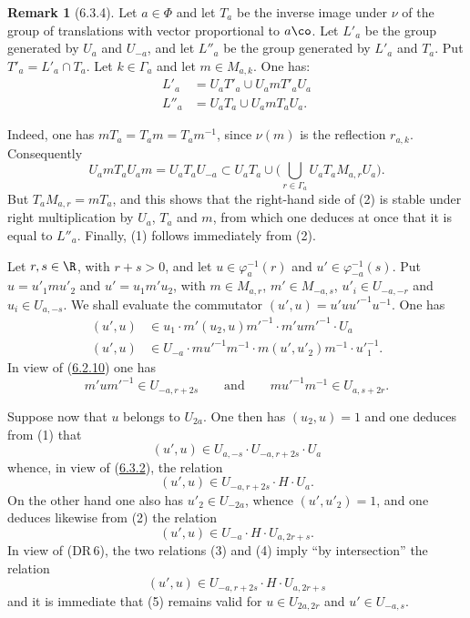 \documentclass[12pt,a4paper,oneside,english]{smfart}
\makeatletter
\newcommand{\btanchor}[1]{\leavevmode\Hy@raisedlink{\hypertarget{bt:#1}{}}}
\newcommand{\btpageanchor}[1]{\Hy@raisedlink{\hypertarget{p:#1}{}}}
\newcommand{\btref}[1]{\hyperlink{bt:#1}{#1}}
\newcommand{\btpage}[1]{\marginnote{p.~#1}\btpageanchor{#1}}
\newcommand{\pmark}[1]{\btpage{#1}}
\theoremstyle{definition}
\theoremstyle{bt}
\newtheorem{rem}{Remark}
\makeatother
\begin{document}
\begin{rem}[6.3.4]\btanchor{6.3.4}
Let $a\in\Phi$ and let $T_a$ be the inverse image under $\nu$ of the group
of translations with vector proportional to $a\co$. Let $L'_a$ be the group
generated by $U_a$ and $U_{-a}$, and let $L''_a$ be the group generated by
$L'_a$ and $T_a$. Put $T'_a=L'_a\cap T_a$. Let $k\in\Gamma_a$ and let
$m\in M_{a,k}$. One has:
\begin{align}
  L'_a&=U_aT'_a\cup U_amT'_aU_a\\
  L''_a&=U_aT_a\cup U_amT_aU_a.
\end{align}
\end{rem}

Indeed, one has $mT_a=T_am=T_am^{-1}$, since $\nu(m)$ is the reflection
$r_{a,k}$. Consequently
\[
  U_amT_aU_am=U_aT_aU_{-a}\subset U_aT_a\cup
   \Big(\bigcup_{r\in\Gamma_a}U_aT_aM_{a,r}U_a\Big).
\]
But $T_aM_{a,r}=mT_a$, and this shows that the right-hand side of (2) is
stable under right multiplication by $U_a$, $T_a$ and $m$, from which one
deduces at once that it is equal to $L''_a$. Finally, (1) follows
immediately from (2).

\pmark{130}
\btanchor{6.3.5}
Let $r,s\in\R$, with $r+s>0$, and let $u\in\varphi_a^{-1}(r)$ and
$u'\in\varphi_{-a}^{-1}(s)$. Put $u=u'_1mu'_2$ and $u'=u_1m'u_2$, with
$m\in M_{a,r}$, $m'\in M_{-a,s}$, $u'_i\in U_{-a,-r}$ and
$u_i\in U_{a,-s}$. We shall evaluate the commutator
$(u',u)=u'uu'^{-1}u^{-1}$. One has
\begin{align}
  (u',u)&\in u_1\cdot m'(u_2,u)m'^{-1}\cdot m'um'^{-1}\cdot U_a\\
  (u',u)&\in U_{-a}\cdot mu'^{-1}m^{-1}\cdot m(u',u'_2)m^{-1}\cdot u'^{-1}_1 .
\end{align}
In view of (\btref{6.2.10}) one has
\[
  m'um'^{-1}\in U_{-a,r+2s}\qquad\text{and}\qquad mu'^{-1}m^{-1}\in U_{a,s+2r}.
\]

Suppose now that $u$ belongs to $U_{2a}$. One then has $(u_2,u)=1$ and one
deduces from (1) that
\[
  (u',u)\in U_{a,-s}\cdot U_{-a,r+2s}\cdot U_a
\]
whence, in view of (\btref{6.3.2}), the relation
\begin{equation}\tag{3}
  (u',u)\in U_{-a,r+2s}\cdot H\cdot U_a .
\end{equation}
On the other hand one also has $u'_2\in U_{-2a}$, whence $(u',u'_2)=1$, and
one deduces likewise from (2) the relation
\begin{equation}\tag{4}
  (u',u)\in U_{-a}\cdot H\cdot U_{a,2r+s}.
\end{equation}
In view of (DR\,6), the two relations (3) and (4) imply ``by intersection''
the relation
\begin{equation}\tag{5}
  (u',u)\in U_{-a,r+2s}\cdot H\cdot U_{a,2r+s}
\end{equation}
and it is immediate that (5) remains valid for $u\in U_{2a,2r}$ and
$u'\in U_{-a,s}$.
\end{document}
